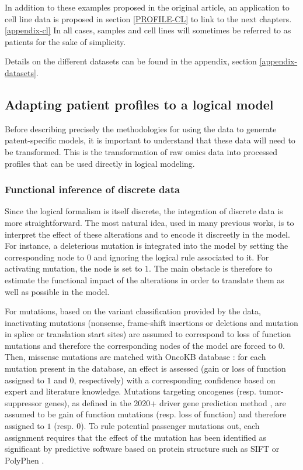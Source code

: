 \documentclass[a4paper,12pt,twoside,onecolumn,openright,final,oldfontcommands]{memoir}
\begin{document}
In addition to these examples proposed in the original article, an
application to cell line data is proposed in section \ref{PROFILE-CL} to
link to the next chapters. \ref{appendix-cl} In all cases, samples and
cell lines will sometimes be referred to as patients for the sake of
simplicity.

Details on the different datasets can be found in the appendix, section
\ref{appendix-datasets}.

\subsection{Adapting patient profiles to a logical
model}\label{adapting-patient-profiles-to-a-logical-model}

Before describing precisely the methodologies for using the data to
generate patent-specific models, it is important to understand that
these data will need to be transformed. This is the transformation of
raw omics data into processed profiles that can be used directly in
logical modeling.

\subsubsection{Functional inference of discrete
data}\label{functional-inference-of-discrete-data}

Since the logical formalism is itself discrete, the integration of
discrete data is more straightforward. The most natural idea, used in
many previous works, is to interpret the effect of these alterations and
to encode it discreetly in the model. For instance, a deleterious
mutation is integrated into the model by setting the corresponding node
to \(0\) and ignoring the logical rule associated to it. For activating
mutation, the node is set to \(1\). The main obstacle is therefore to
estimate the functional impact of the alterations in order to translate
them as well as possible in the model.

For mutations, based on the variant classification provided by the data,
inactivating mutations (nonsense, frame-shift insertions or deletions
and mutation in splice or translation start sites) are assumed to
correspond to loss of function mutations and therefore the corresponding
nodes of the model are forced to \(0\). Then, missense mutations are
matched with OncoKB database \citep{chakravarty2017oncokb}: for each
mutation present in the database, an effect is assessed (gain or loss of
function assigned to \(1\) and \(0\), respectively) with a corresponding
confidence based on expert and literature knowledge. Mutations targeting
oncogenes (resp. tumor-suppressor genes), as defined in the 2020+ driver
gene prediction method \citep{tokheim2016evaluating}, are assumed to be
gain of function mutations (resp. loss of function) and therefore
assigned to \(1\) (resp. \(0\)). To rule potential passenger mutations
out, each assignment requires that the effect of the mutation has been
identified as significant by predictive software based on protein
structure such as SIFT \citep{kumar2009predicting} or PolyPhen
\citep{adzhubei2010method}.
\end{document}
